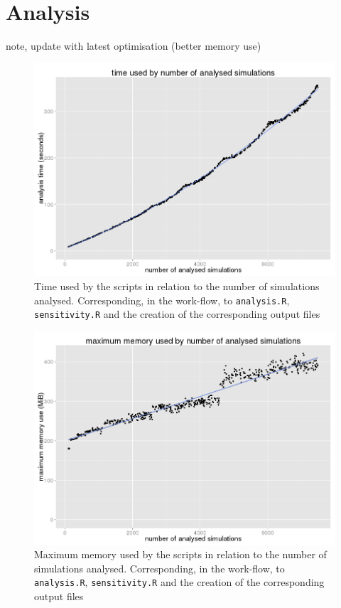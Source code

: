 \documentclass[a4paper,12pt]{report}
\begin{document}
\section{Analysis}
note, update with latest optimisation (better memory use)
\begin{figure}[ht]
	\centering
	\includegraphics[scale=0.39]{../data/analysis-timeByNSimulations.png}
	\caption{Time used by the scripts in relation to the number of simulations analysed. Corresponding, in the work-flow, to \texttt{analysis.R}, \texttt{sensitivity.R} and the creation of the corresponding output files}
	\label{app:bench-analysis-time}
\end{figure}

\begin{figure}[ht]
	\centering
	\includegraphics[scale=0.39]{../data/analysis-maxMemByNSimulations.png}
	\caption{Maximum memory used by the scripts in relation to the number of simulations analysed. Corresponding, in the work-flow, to \texttt{analysis.R}, \texttt{sensitivity.R} and the creation of the corresponding output files}
	\label{app:bench-analysis-mem}
\end{figure}

\end{document}
